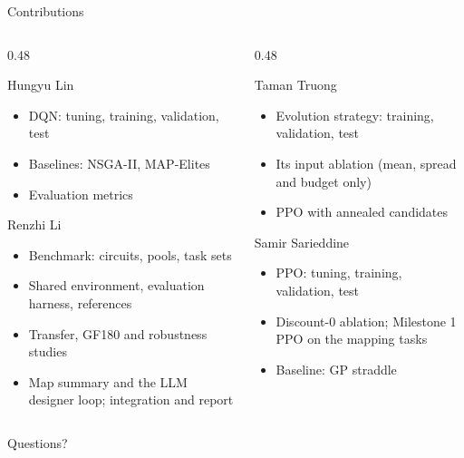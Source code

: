 \documentclass[aspectratio=169, 11pt]{beamer}
\begin{document}
\ifdefined\onlypart\else
\begin{frame}{Contributions}
  \footnotesize
  \begin{columns}[T, onlytextwidth]
    \begin{column}{0.48\textwidth}
      \begin{block}{Hungyu Lin}
        \begin{itemize}
          \item DQN: tuning, training, validation, test
          \item Baselines: NSGA-II, MAP-Elites
          \item Evaluation metrics
        \end{itemize}
      \end{block}
      \begin{block}{Renzhi Li}
        \begin{itemize}
          \item Benchmark: circuits, pools, task sets
          \item Shared environment, evaluation harness, references
          \item Transfer, GF180 and robustness studies
          \item Map summary and the LLM designer loop; integration and report
        \end{itemize}
      \end{block}
    \end{column}
    \begin{column}{0.48\textwidth}
      \begin{block}{Taman Truong}
        \begin{itemize}
          \item Evolution strategy: training, validation, test
          \item Its input ablation (mean, spread and budget only)
          \item PPO with annealed candidates
        \end{itemize}
      \end{block}
      \begin{block}{Samir Sarieddine}
        \begin{itemize}
          \item PPO: tuning, training, validation, test
          \item Discount-0 ablation; Milestone 1 PPO on the mapping tasks
          \item Baseline: GP straddle
        \end{itemize}
      \end{block}
    \end{column}
  \end{columns}
\end{frame}

\begin{frame}[standout]
  Questions?
\end{frame}
\fi
\end{document}
